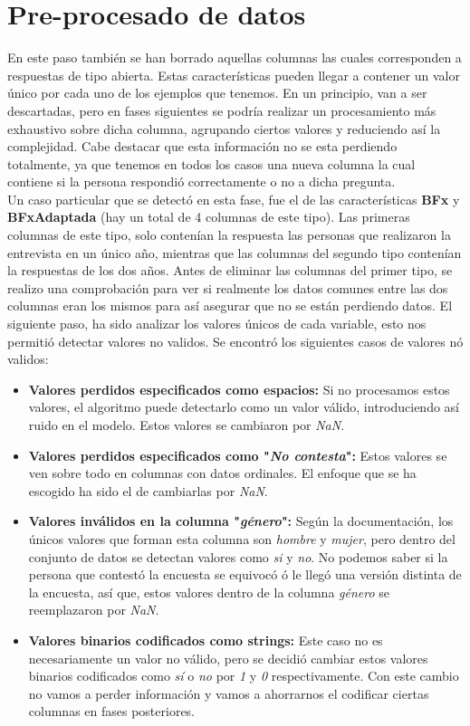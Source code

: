 \section{Pre-procesado de datos}
En este paso también se han borrado aquellas columnas las cuales corresponden a respuestas de tipo abierta. Estas características pueden llegar a contener un valor único por cada uno de los ejemplos que tenemos. En un principio, van a ser descartadas, pero en fases siguientes se podría realizar un procesamiento más exhaustivo sobre dicha columna, agrupando ciertos valores y reduciendo así la complejidad. Cabe destacar que esta información no se esta perdiendo totalmente, ya que tenemos en todos los casos una nueva columna la cual contiene si la persona respondió correctamente o no a dicha pregunta. \\
\linebreak
Un caso particular que se detectó en esta fase, fue el de las características \textbf{BFx} y \textbf{BFxAdaptada} (hay un total de 4 columnas de este tipo). Las primeras columnas de este tipo, solo contenían la respuesta las personas que realizaron la entrevista en un único año, mientras que las columnas del segundo tipo contenían la respuestas de los dos años. Antes de eliminar las columnas del primer tipo, se realizo una comprobación para ver si realmente los datos comunes entre las dos columnas eran los mismos para así asegurar que no se están perdiendo datos.
\linebreak
El siguiente paso, ha sido analizar los valores únicos de cada variable, esto nos permitió detectar valores no validos. Se encontró los siguientes casos de valores nó validos:
\begin{itemize}
	\item \textbf{Valores perdidos especificados como espacios:} Si no procesamos estos valores, el algoritmo puede detectarlo como un valor válido, introduciendo así ruido en el modelo. Estos valores se cambiaron por \textit{NaN}.
	\item \textbf{Valores perdidos especificados como "\textit{No contesta}":} Estos valores se ven sobre todo en columnas con datos ordinales. El enfoque que se ha escogido ha sido el de cambiarlas por \textit{NaN}.
	\item \textbf{Valores inválidos en la columna "\textit{género}":} Según la documentación, los únicos valores que forman esta columna son \textit{hombre} y \textit{mujer}, pero dentro del conjunto de datos se detectan valores como \textit{si} y \textit{no}. No podemos saber si la persona que contestó la encuesta se equivocó ó le llegó una versión distinta de la encuesta, así que, estos valores dentro de la columna \textit{género} se reemplazaron por \textit{NaN}.
	\item \textbf{Valores binarios codificados como strings:} Este caso no es necesariamente un valor no válido, pero se decidió cambiar estos valores binarios codificados como \textit{sí} o \textit{no} por \textit{1} y \textit{0} respectivamente. Con este cambio no vamos a perder información y vamos a ahorrarnos el codificar ciertas columnas en fases posteriores.
\end{itemize}
